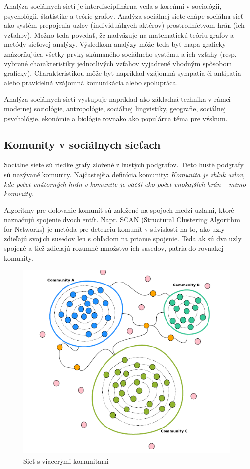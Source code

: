 \documentclass[slovak,master,public,dept460,male,cpdeclaration,oneside]{diploma}
\begin{document}
Analýza sociálnych sietí je interdisciplinárna veda s koreňmi v sociológii, psychológii,
štatistike a teórie grafov. Analýza sociálnej siete chápe sociálnu sieť ako systém prepojenia uzlov (individuálnych aktérov) prostredníctvom hrán (ich vzťahov). Možno teda povedať, že nadväzuje na matematickú teóriu grafov a metódy sieťovej analýzy. Výsledkom analýzy môže teda byť mapa graficky znázorňujúca všetky prvky skúmaného sociálneho systému a ich vzťahy (resp. vybrané charakteristiky jednotlivých vzťahov vyjadrené vhodným spôsobom graficky). Charakteristikou môže byť napríklad vzájomná sympatia či antipatia alebo pravidelná vzájomná komunikácia alebo spolupráca.


Analýza sociálnych sietí vystupuje napríklad ako základná technika v rámci modernej sociológie,
antropológie, sociálnej lingvistiky, geografie, sociálnej psychológie, ekonómie a biológie
rovnako ako populárna téma pre výskum. 

\subsection{Komunity v sociálnych sieťach}

Sociálne siete sú riedke grafy zložené z hustých podgrafov. Tieto husté podgrafy sú nazývané
komunity. Najčastejšia definícia komunity: \textit{Komunita je zhluk uzlov, kde počet vnútorných hrán v komunite je väčší ako počet vnokajších hrán – mimo komunity}. \cite{8}

Algoritmy pre dolovanie komunít sú založené na spojoch medzi uzlami, ktoré naznačujú
spojenie dvoch entít. Napr. SCAN (Structural Clustering Algorithm for Networks) je metóda
pre detekciu komunít v súvislosti na to, ako uzly zdieľajú svojich susedov len s ohľadom na
priame spojenie. Teda ak sú dva uzly spojené a tiež zdieľajú rozumné množstvo ich susedov,
patria do rovnakej komunity.


\begin{figure}[H]
\centering
\includegraphics[width=12cm,height=10cm]{figures/comunities}
\caption{Sieť s viacerými komunitami}
\end{figure}
\end{document}
